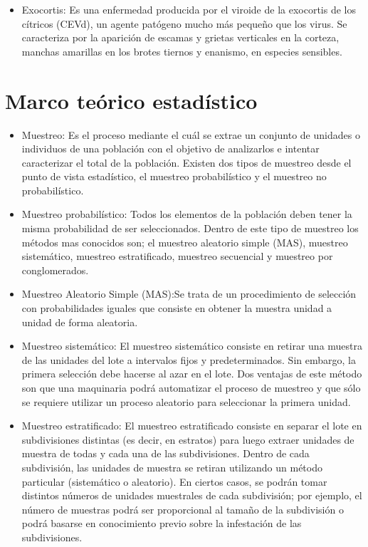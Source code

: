 \begin{itemize}
\item Exocortis: Es una enfermedad producida por el viroide de la exocortis de los c\'{i}tricos (CEVd), un agente pat\'{o}geno mucho m\'{a}s peque\~{n}o que los virus. Se caracteriza por la aparici\'{o}n de escamas y grietas verticales en la corteza, manchas amarillas en los brotes tiernos y enanismo, en especies sensibles.\cite{EXO}
\end{itemize}

\section{Marco te\'{o}rico estad\'{i}stico}
\begin{itemize}
\item Muestreo: Es el proceso mediante el cu\'{a}l se extrae un conjunto de unidades o individuos de una poblaci\'{o}n con el objetivo de analizarlos e intentar caracterizar el total de la poblaci\'{o}n. Existen dos tipos de muestreo desde el punto de vista estad\'{i}stico, el muestreo probabil\'{i}stico y el muestreo no probabil\'{i}stico.
\item Muestreo probabil\'{i}stico: Todos los elementos de la poblaci\'{o}n deben tener la misma probabilidad de ser seleccionados. Dentro de este tipo de muestreo los m\'{e}todos mas conocidos son; el muestreo aleatorio simple (MAS), muestreo sistem\'{a}tico, muestreo estratificado, muestreo secuencial y muestreo por conglomerados.
\item Muestreo Aleatorio Simple (MAS):Se trata de un procedimiento de selecci\'{o}n con probabilidades iguales que consiste en obtener la muestra unidad a unidad de forma aleatoria.\cite{M}
\item Muestreo sistem\'{a}tico: El muestreo sistem\'{a}tico consiste en retirar una muestra de las unidades del lote a intervalos fijos y predeterminados. Sin embargo, la primera selecci\'{o}n debe hacerse al azar en el lote. Dos ventajas de este m\'{e}todo son que una maquinaria podr\'{a} automatizar el proceso de muestreo y que s\'{o}lo se requiere utilizar un proceso aleatorio para seleccionar la primera unidad.\cite{MUES}
\item Muestreo estratificado: El muestreo estratificado consiste en separar el lote en subdivisiones distintas (es decir, en estratos) para luego extraer
unidades de muestra de todas y cada una de las subdivisiones. Dentro de cada subdivisi\'{o}n, las unidades de muestra se retiran utilizando un m\'{e}todo particular (sistem\'{a}tico o aleatorio). En ciertos casos, se podr\'{a}n tomar distintos n\'{u}meros de unidades muestrales de cada subdivisi\'{o}n; por ejemplo, el n\'{u}mero de muestras podr\'{a} ser proporcional al tama\~{n}o de la subdivisi\'{o}n o podr\'{a} basarse en conocimiento previo sobre la infestaci\'{o}n de las subdivisiones.\cite{MUES}

\end{itemize}
